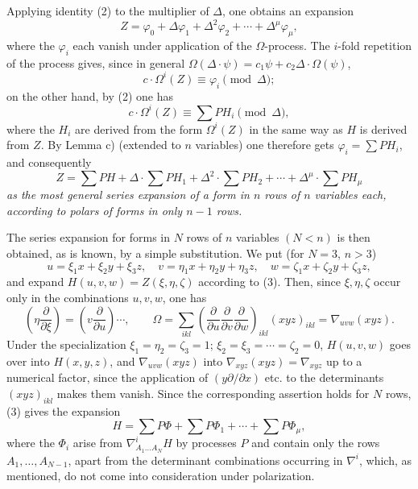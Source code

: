 \documentclass[11pt]{article}
\begin{document}
Applying identity (2) to the multiplier of $\Delta$, one obtains an expansion
\[
  Z=\varphi_0+\Delta\varphi_1+\Delta^2\varphi_2+\cdots+\Delta^\mu\varphi_\mu,
\]
where the $\varphi_i$ each vanish under application of the $\Omega$-process. The $i$-fold repetition of the process gives, since in general $\Omega(\Delta\cdot\psi)=c_1\psi+c_2\Delta\cdot\Omega(\psi)$,
\[
  c\cdot \Omega^i(Z)\equiv\varphi_i\pmod{\Delta};
\]
on the other hand, by (2) one has
\[
  c\cdot\Omega^i(Z)\equiv\sum PH_i\pmod{\Delta},
\]
where the $H_i$ are derived from the form $\Omega^i(Z)$ in the same way as $H$ is derived from $Z$. By Lemma c) (extended to $n$ variables) one therefore gets $\varphi_i=\sum PH_i$, and consequently
\begin{equation}
  Z=\sum PH+\Delta\cdot\sum PH_1+\Delta^2\cdot\sum PH_2+
  \cdots+\Delta^\mu\cdot\sum PH_\mu
\tag{3}
\end{equation}
\emph{as the most general series expansion of a form in $n$ rows of $n$ variables each, according to polars of forms in only $n-1$ rows.}

The series expansion for forms in $N$ rows of $n$ variables $(N<n)$ is then obtained, as is known, by a simple substitution. We put (for $N=3$, $n>3$)
\[
  u=\xi_1x+\xi_2y+\xi_3z,
  \quad v=\eta_1x+\eta_2y+\eta_3z,
  \quad w=\zeta_1x+\zeta_2y+\zeta_3z,
\]
and expand $H(u,v,w)=Z(\xi,\eta,\zeta)$ according to (3). Then, since $\xi,\eta,\zeta$ occur only in the combinations $u,v,w$, one has
\[
  \left(\eta\frac{\partial}{\partial \xi}\right)=
  \left(v\frac{\partial}{\partial u}\right)\cdots,
  \qquad
  \Omega=\sum_{ikl}\left(\frac{\partial}{\partial u}
  \frac{\partial}{\partial v}
  \frac{\partial}{\partial w}\right)_{ikl}(xyz)_{ikl}
  =\nabla_{uvw}(xyz).
\]
Under the specialization $\xi_1=\eta_2=\zeta_3=1$; $\xi_2=\xi_3=\cdots=\zeta_2=0$, $H(u,v,w)$ goes over into $H(x,y,z)$, and $\nabla_{uvw}(xyz)$ into $\nabla_{xyz}(xyz)=\nabla_{xyz}$ up to a numerical factor, since the application of $(y\partial/\partial x)$ etc. to the determinants $(xyz)_{ikl}$ makes them vanish. Since the corresponding assertion holds for $N$ rows, (3) gives the expansion
\begin{equation}
  H=\sum P\Phi+\sum P\Phi_1+\cdots+\sum P\Phi_\mu,
\tag{4}
\end{equation}
where the $\Phi_i$ arise from $\nabla^i_{A_1\ldots A_N}H$ by processes $P$ and contain only the rows $A_1,
\ldots,A_{N-1}$, apart from the determinant combinations occurring in $\nabla^i$, which, as mentioned, do not come into consideration under polarization.
\end{document}
